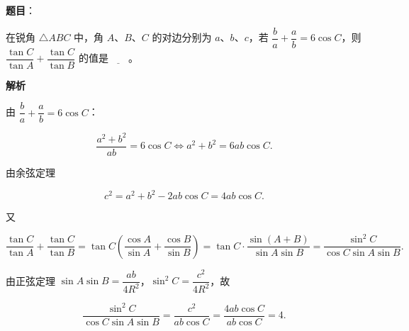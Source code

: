 \begin{answer}

\textbf{题目}：

在锐角 $\triangle ABC$ 中，角 $A$、$B$、$C$ 的对边分别为 $a$、$b$、$c$，若 $\dfrac ba+\dfrac ab=6\cos C$，则 $\dfrac{\tan C}{\tan A}+\dfrac{\tan C}{\tan B}$ 的值是$\underline{\qquad}$。

\textbf{解析}

由 $\dfrac ba+\dfrac ab=6\cos C$：

\nopagebreak[4]
\[\frac{a^2+b^2}{ab}=6\cos C\iff a^2+b^2=6ab\cos C.\]

由余弦定理

\nopagebreak[4]
\[c^2=a^2+b^2-2ab\cos C=4ab\cos C.\]

又

\nopagebreak[4]
\[\frac{\tan C}{\tan A}+\frac{\tan C}{\tan B}
=\tan C\left(\frac{\cos A}{\sin A}+\frac{\cos B}{\sin B}\right)
=\tan C\cdot\frac{\sin(A+B)}{\sin A\sin B}
=\frac{\sin^2C}{\cos C\sin A\sin B}.\]

由正弦定理 $\sin A\sin B=\dfrac{ab}{4R^2}$，$\sin^2C=\dfrac{c^2}{4R^2}$，故

\nopagebreak[4]
\[\frac{\sin^2C}{\cos C\sin A\sin B}
=\frac{c^2}{ab\cos C}
=\frac{4ab\cos C}{ab\cos C}=4.\]


\end{answer}
